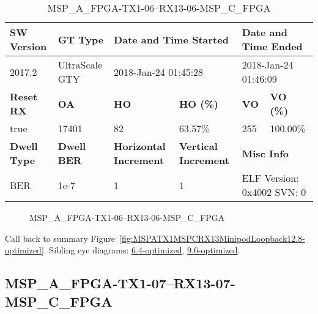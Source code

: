 \begin{table}[h]
\centering
\caption{MSP\_A\_FPGA-TX1-06--RX13-06-MSP\_C\_FPGA}
\label{tab:MSPAFPGATX106RX1306MSPCFPGA12.8-optimized}
\begin{tabular}{@{}|l|l|l|l|l|l|@{}}
\toprule
\textbf{SW Version}                & \textbf{GT Type}   & \multicolumn{2}{l|}{\textbf{Date and Time Started}}            & \multicolumn{2}{l|}{\textbf{Date and Time Ended}}        \\ \midrule
2017.2                       & UltraScale GTY          & \multicolumn{2}{l|}{2018-Jan-24 01:45:28}                   & \multicolumn{2}{l|}{2018-Jan-24 01:46:09}               \\ \midrule
\textbf{Reset RX}                  & \textbf{OA} & \textbf{HO}   & \textbf{HO (\%)} & \textbf{VO} & \textbf{VO (\%)} \\ \midrule
true & 17401        & 82          & 63.57\%        & 255        & 100.00\%       \\ \midrule
\textbf{Dwell Type}                & \textbf{Dwell BER} & \textbf{Horizontal Increment} & \textbf{Vertical Increment}    & \multicolumn{2}{l|}{\textbf{Misc Info}}                  \\ \midrule
BER                            & 1e-7        & 1        & 1           & \multicolumn{2}{l|}{ELF Version: 0x4002 SVN: 0}                         \\ \bottomrule
\end{tabular}
\end{table}

\begin{figure}[h]
\caption{MSP\_A\_FPGA-TX1-06--RX13-06-MSP\_C\_FPGA} \label{fig:MSPAFPGATX106RX1306MSPCFPGA12.8-optimized}
\end{figure}

Call back to summary Figure~\ref{fig:MSPATX1MSPCRX13MinipodLoopback12.8-optimized}.
Sibling eye diagrams: \hyperref[sec:MSPAFPGATX106RX1306MSPCFPGA6.4-optimized]{6.4-optimized}, \hyperref[sec:MSPAFPGATX106RX1306MSPCFPGA9.6-optimized]{9.6-optimized}.

\clearpage
\newpage


\subsection{MSP\_A\_FPGA-TX1-07--RX13-07-MSP\_C\_FPGA}\label{sec:MSPAFPGATX107RX1307MSPCFPGA12.8-optimized}


